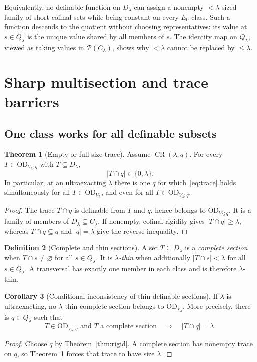 \documentclass[11pt,letterpaper]{article}
\theoremstyle{definition}
\newtheorem{definition}{Definition}[section]
\newtheorem{theorem}[definition]{Theorem}
\newtheorem{corollary}[definition]{Corollary}
\numberwithin{equation}{section}
\newcommand{\OD}{\mathrm{OD}}
\newcommand{\Pow}{\mathcal P}
\newcommand{\D}{D_\lambda}
\newcommand{\Q}{Q_\lambda}
\newcommand{\C}{C_\lambda}
\newcommand{\ODlow}{\OD_{V_\lambda}}
\newcommand{\ODq}{\OD_{V_\lambda;q}}
\newcommand{\Rig}{\operatorname{CR}}
\begin{document}
Equivalently, no definable function on $\D$ can assign a nonempty $<\lambda$-sized family of short cofinal sets while being constant on every $E_0$-class. Such a function descends to the quotient without choosing representatives: its value at $s\in\Q$ is the unique value shared by all members of $s$. The identity map on $\Q$, viewed as taking values in $\Pow(\C)$, shows why $<\lambda$ cannot be replaced by $\le\lambda$.

\section{Sharp multisection and trace barriers}\label{sec:sections}

\subsection{One class works for all definable subsets}

\begin{theorem}[Empty-or-full-size trace]\label{thm:trace}
Assume $\Rig(\lambda,q)$. For every $T\in\ODq$ with $T\subseteq\D$,
\begin{equation}
|T\cap q|\in\{0,\lambda\}.
\label{eq:trace}
\end{equation}
In particular, at an ultraexacting $\lambda$ there is one $q$ for which~\eqref{eq:trace} holds simultaneously for all $T\in\ODlow$, and even for all $T\in\ODq$.
\end{theorem}
\begin{proof}
The trace $T\cap q$ is definable from $T$ and $q$, hence belongs to $\ODq$. It is a family of members of $\D\subseteq\C$. If nonempty, cofinal rigidity gives $|T\cap q|\ge\lambda$, whereas $T\cap q\subseteq q$ and $|q|=\lambda$ give the reverse inequality.
\end{proof}

\begin{definition}[Complete and thin sections]
A set $T\subseteq\D$ is a \emph{complete section} when $T\cap s\ne\varnothing$ for all $s\in\Q$. It is \emph{$\lambda$-thin} when additionally $|T\cap s|<\lambda$ for all $s\in\Q$. A transversal has exactly one member in each class and is therefore $\lambda$-thin.
\end{definition}

\begin{corollary}[Conditional inconsistency of thin definable sections]\label{cor:thin}
If $\lambda$ is ultraexacting, no $\lambda$-thin complete section belongs to $\ODlow$. More precisely, there is $q\in\Q$ such that
\[
T\in\ODq\text{ and }T\text{ a complete section}
\quad\Longrightarrow\quad |T\cap q|=\lambda.
\]
\end{corollary}
\begin{proof}
Choose $q$ by Theorem~\ref{thm:rigid}. A complete section has nonempty trace on $q$, so Theorem~\ref{thm:trace} forces that trace to have size $\lambda$.
\end{proof}
\end{document}
